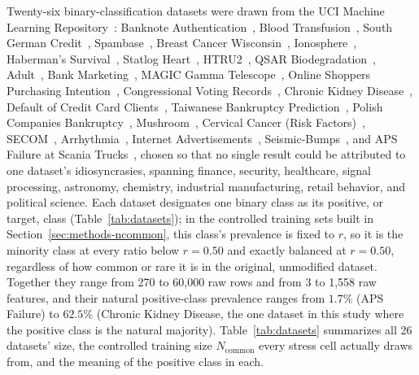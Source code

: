Twenty-six binary-classification datasets were drawn from the UCI Machine
Learning Repository~\cite{kelly_uci}: Banknote
Authentication~\cite{lohweg2012banknote},
Blood Transfusion~\cite{yeh2008bloodtransfusion}, South German
Credit~\cite{groemping2019germancredit}, Spambase~\cite{hopkins1999spambase},
Breast Cancer Wisconsin~\cite{wolberg1993breastcancer},
Ionosphere~\cite{sigillito1989ionosphere}, Haberman's
Survival~\cite{haberman1999survival}, Statlog
Heart~\cite{statlogheart}, HTRU2~\cite{lyon2015htru2}, QSAR
Biodegradation~\cite{mansouri2013qsar}, Adult~\cite{becker1996adult},
Bank Marketing~\cite{moro2014bankmarketing}, MAGIC Gamma
Telescope~\cite{bock2004magic}, Online Shoppers Purchasing
Intention~\cite{sakar2018onlineshoppers}, Congressional Voting
Records~\cite{uci1987congressionalvoting}, Chronic Kidney
Disease~\cite{rubini2015ckd}, Default of Credit Card
Clients~\cite{yeh2009creditcard}, Taiwanese Bankruptcy
Prediction~\cite{uci2020taiwanbankruptcy}, Polish Companies
Bankruptcy~\cite{tomczak2016polishbankruptcy}, Mushroom~\cite{uci1981mushroom},
Cervical Cancer (Risk Factors)~\cite{fernandes2017cervical},
SECOM~\cite{mccann2008secom}, Arrhythmia~\cite{guvenir1997arrhythmia},
Internet Advertisements~\cite{kushmerick1999internetads},
Seismic-Bumps~\cite{sikora2010seismic}, and APS Failure at Scania
Trucks~\cite{scania2016apsfailure}, chosen so that no single result could be
attributed to one dataset's idiosyncrasies, spanning finance, security,
healthcare, signal processing, astronomy, chemistry, industrial
manufacturing, retail behavior, and political science. Each dataset
designates one binary class as its positive, or target, class
(Table~\ref{tab:datasets}); in the controlled training sets built in
Section~\ref{sec:methods-ncommon}, this class's prevalence is fixed to
$r$, so it is the minority class at every ratio below $r{=}0.50$ and
exactly balanced at $r{=}0.50$, regardless of how common or rare it is
in the original, unmodified dataset. Together they range
from 270 to 60,000 raw rows and from 3 to 1{,}558 raw features, and their
natural positive-class prevalence ranges from $1.7\%$ (APS Failure) to
$62.5\%$ (Chronic Kidney Disease, the one dataset in this study where the
positive class is the natural majority). Table~\ref{tab:datasets}
summarizes all 26 datasets' size, the controlled training size
$N_{\text{common}}$ every stress cell actually draws from, and the meaning
of the positive class in each.

